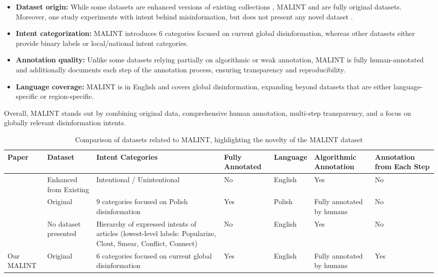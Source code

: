 \documentclass[11pt]{article}
\begin{document}
\begin{itemize}[nosep, leftmargin=*]
    \item \textbf{Dataset origin:} While some datasets are enhanced versions of existing collections \citet{Zhou_2022}, MALINT and \citet{modzelewski2024mipd} are fully original datasets. Moreover, one study experiments with intent behind misinformation, but does not present any novel dataset \citet{wang2024misinformation}.
    \item \textbf{Intent categorization:} MALINT introduces 6 categories focused on current global disinformation, whereas other datasets either provide binary labels or local/national intent categories.
    \item \textbf{Annotation quality:} Unlike some datasets relying partially on algorithmic or weak annotation, MALINT is fully human-annotated and additionally documents each step of the annotation process, ensuring transparency and reproducibility.
    \item \textbf{Language coverage:} MALINT is in English and covers global disinformation, expanding beyond datasets that are either language-specific or region-specific.
\end{itemize}

Overall, MALINT stands out by combining original data, comprehensive human annotation, multi-step transparency, and a focus on globally relevant disinformation intents.



\begin{table}[ht]
\centering
\scriptsize
\begin{tabular}{@{}p{2cm}p{2.5cm}p{3.0cm}p{1.8cm}p{1cm}p{1.5cm}p{1.5cm}@{}}
\toprule
Paper & Dataset & Intent Categories & Fully Annotated & Language & Algorithmic Annotation & Annotation from Each Step \\ \midrule
\citet{Zhou_2022} & Enhanced from Existing & Intentional / Unintentional & No & English & Yes & No \\
\midrule
\citet{modzelewski2024mipd} & Original & 9 categories focused on Polish disinformation & Yes & Polish & Fully annotated by humans & No \\
\midrule
\citet{wang2024misinformation} & No dataset presented & Hierarchy of expressed intents of articles (lowest-level labels: Popularize, Clout, Smear, Conflict, Connect) & No & English & Yes & No \\
\midrule
Our MALINT & Original & 6 categories focused on current global disinformation & Yes & English & Fully annotated by humans & Yes \\ \bottomrule
\end{tabular}
\caption{Comparison of datasets related to MALINT, highlighting the novelty of the MALINT dataset}
\label{tab:table_comparison_to_other_banchmarks}
\end{table}
\end{document}
